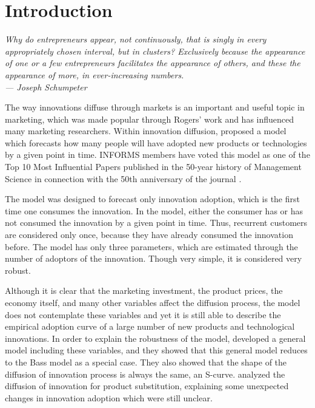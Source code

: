 
\chapter{Introduction}

\bigskip

\begin{flushright}{\slshape
    {Why do entrepreneurs appear, not continuously, that is singly in every appropriately chosen interval, but in clusters? Exclusively because the appearance of one or a few entrepreneurs facilitates the appearance of others, and these the appearance of more, in ever-increasing numbers.}
	\\ \medskip
    --- Joseph Schumpeter}
\end{flushright}
\bigskip
\bigskip



The way innovations diffuse through markets is an important and useful topic in marketing, which was made popular through Rogers' work \citep{rogers1962diffusion} and has influenced many marketing researchers. Within innovation diffusion, \citet{bass1969} proposed a model which forecasts how many people will have adopted new products or technologies by a given point in time. INFORMS members have voted this model as one of the Top 10 Most Influential Papers published in the 50-year history of Management Science in connection with the 50th anniversary of the journal \citep{bass2004comments}.

The \citet{bass1969} model was designed to forecast only innovation adoption, which is the first time one consumes the innovation. In the model, either the consumer has or has not consumed the innovation by a given point in time. Thus, recurrent customers are considered only once, because they have already consumed the innovation before. The model has only three parameters, which are estimated through the number of adoptors of the innovation. Though very simple, it is considered very robust.

Although it is clear that the marketing investment, the product prices, the economy itself, and many other variables affect the diffusion process, the \citet{bass1969} model does not contemplate these variables and yet it is still able to describe the empirical adoption curve of a large number of new products and technological innovations. In order to explain the robustness of the model, \citet{bass1994bass} developed a general model including these variables, and they showed that this general model reduces to the Bass model as a special case. They also showed that the shape of the diffusion of innovation process is always the same, an S-curve. \citet{norton1987diffusion} analyzed the diffusion of innovation for product substitution, explaining some unexpected changes in innovation adoption which were still unclear.

